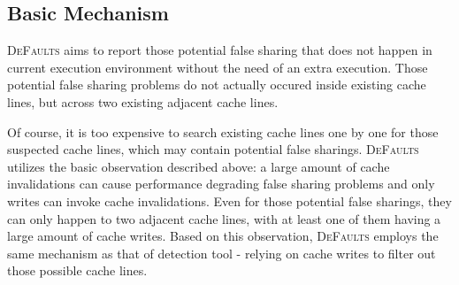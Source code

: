 \documentclass[10pt]{sigplanconf}
\newcommand{\defaults}{{\scshape DeFaults}}
\begin{document}
\subsection{Basic Mechanism}

\defaults{} aims to report those potential false sharing that does not happen in current execution 
environment without the need of an extra execution. 
Those potential false sharing problems do not actually occured inside existing cache lines, 
but across two existing adjacent cache lines.

Of course, it is too expensive to search existing cache lines one by one for those suspected cache lines, which may contain 
potential false sharings. \defaults{} utilizes the basic observation described above: a large amount of cache invalidations 
can cause performance degrading false sharing problems and only writes can invoke cache invalidations. 
Even for those potential false sharings, they can only happen to two adjacent cache lines, with at least one of them 
having a large amount of cache writes.
Based on this observation, \defaults{} employs the same mechanism as that of detection tool - relying on cache writes to filter out
those possible cache lines. 
\end{document}
